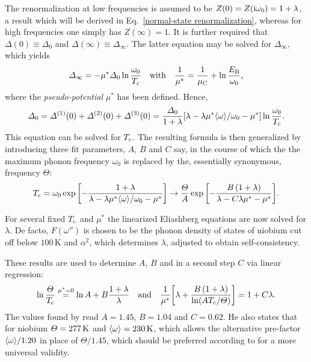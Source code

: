 The renormalization at low frequencies is assumed to be $Z(0) = Z(\mathrm i \omega_0) =
1 + \lambda$, a result which will be derived in Eq.~\ref{normal-state
renormalization}, whereas for high frequencies one simply has $Z(\infty) = 1$.
It is further required that $\Delta(0) \equiv \Delta_0$ and $\Delta(\infty)
\equiv \Delta_\infty$. The latter equation may be solved for $\Delta_\infty$,
which yields
%
\begin{equation} \label{McMillan's Coulomb pseudo-potential}
    \varDelta_\infty = -\mu^* \varDelta_0 \ln \frac{\omega_0}{T \sb{\text{c}}}
    \quad \text{with} \quad
    \frac 1 {\mu^*} = \frac 1 {\mu \sb{\text{C}}} + \ln \frac{E \sb{\text{B}}}{\omega_0},
\end{equation}
%
where the \emph{ pseudo-potential} $\mu^*$ has been defined.
Hence,
%
\begin{equation*}
    \varDelta_0 = \varDelta^{(1)}(0) + \varDelta^{(2)}(0) + \varDelta^{(3)}(0)
    = \frac{\varDelta_0}{1 + \lambda}
    [\lambda - \lambda \mu^* \langle\omega\rangle / \omega_0 - \mu^*]
    \ln \frac{\omega_0}{T \sb{\text{c}}}.
\end{equation*}
%
This equation can be solved for $T \sb{\text{c}}$. The resulting formula is then
generalized by introducing three fit parameters, $A$, $B$ and $C$ say, in the
course of which the the maximum phonon frequency $\omega_0$ is replaced by the,
essentially synonymous,  frequency $\Theta$:
%
\begin{equation*}
    T \sb{\text{c}} = \omega_0 \exp \bigg[ {-\frac
        {1 + \lambda}
        {\lambda - \lambda \mu^* \langle\omega\rangle / \omega_0 - \mu^*}}
    \bigg]
    \rightarrow \frac {\varTheta} A \exp \bigg[ {-\frac
        {B \, (1 + \lambda)}
        {\lambda - C \lambda \mu^* - \mu^*}}
    \bigg].
\end{equation*}

For several fixed $T \sb{\text{c}}$ and $\mu^*$ the linearized Eliashberg equations are
now solved for $\lambda$. De facto, $F(\omega'')$ is chosen to be the phonon
density of states of niobium \cite{NakagawaWoods63} cut off below
$100\,\mathrm{K}$ and $\alpha^2$, which determines $\lambda$, adjusted to obtain
self-consistency.

These results are used to determine $A$, $B$ and in a second step $C$ via linear
regression:
%
\begin{equation} \label{linear regression formulas}
    \ln \frac {\varTheta} {T \sb{\text{c}}} \overset{\mu^* = 0}
    = \ln A + B \frac{1 + \lambda}{\lambda}
    \quad \text{and} \quad
    \frac 1 {\mu^*} \bigg[
        \lambda + \frac{B \, (1 + \lambda)}{\ln (A T \sb{\text{c}} / \varTheta)}
    \bigg] = 1 + C \lambda.
\end{equation}
%
The values found by  read $A = 1.45$, $B = 1.04$ and $C = 0.62$.
He also states that for niobium $\varTheta = 277\,\mathrm K$ and $\langle\omega\rangle =
230\,\mathrm K$, which allows the alternative pre-factor $\langle\omega\rangle / 1.20$ in
place of $\Theta / 1.45$, which should be preferred according to 
\cite{Dynes72} for a more universal validity.

